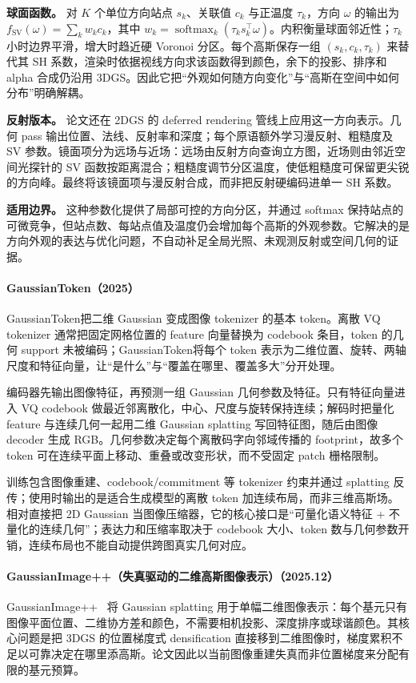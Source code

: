 \textbf{球面函数。} 对 $K$ 个单位方向站点 $s_k$、关联值 $c_k$ 与正温度 $\tau_k$，方向 $\omega$ 的输出为 $f_{\mathrm{SV}}(\omega)=\sum_k w_kc_k$，其中 $w_k=\operatorname{softmax}_k(\tau_k s_k^\top\omega)$。内积衡量球面邻近性；$\tau_k$ 小时边界平滑，增大时趋近硬 Voronoi 分区。每个高斯保存一组 $(s_k,c_k,\tau_k)$ 来替代其 SH 系数，渲染时依据视线方向求该函数得到颜色，余下的投影、排序和 alpha 合成仍沿用 3DGS。因此它把“外观如何随方向变化”与“高斯在空间中如何分布”明确解耦。

\textbf{反射版本。} 论文还在 2DGS 的 deferred rendering 管线上应用这一方向表示。几何 pass 输出位置、法线、反射率和深度；每个原语额外学习漫反射、粗糙度及 SV 参数。镜面项分为远场与近场：远场由反射方向查询立方图，近场则由邻近空间光探针的 SV 函数按距离混合；粗糙度调节分区温度，使低粗糙度可保留更尖锐的方向峰。最终将该镜面项与漫反射合成，而非把反射硬编码进单一 SH 系数。

\textbf{适用边界。} 这种参数化提供了局部可控的方向分区，并通过 softmax 保持站点的可微竞争，但站点数、每站点值及温度仍会增加每个高斯的外观参数。它解决的是方向外观的表达与优化问题，不自动补足全局光照、未观测反射或空间几何的证据。

\paragraph{GaussianToken（2025）\cite{2501_15619}}
GaussianToken把二维 Gaussian 变成图像 tokenizer 的基本 token。离散 VQ tokenizer 通常把固定网格位置的 feature 向量替换为 codebook 条目，token 的几何 support 未被编码；GaussianToken将每个 token 表示为二维位置、旋转、两轴尺度和特征向量，让“是什么”与“覆盖在哪里、覆盖多大”分开处理。

编码器先输出图像特征，再预测一组 Gaussian 几何参数及特征。只有特征向量进入 VQ codebook 做最近邻离散化，中心、尺度与旋转保持连续；解码时把量化 feature 与连续几何一起用二维 Gaussian splatting 写回特征图，随后由图像 decoder 生成 RGB。几何参数决定每个离散码字向邻域传播的 footprint，故多个 token 可在连续平面上移动、重叠或改变形状，而不受固定 patch 栅格限制。

训练包含图像重建、codebook/commitment 等 tokenizer 约束并通过 splatting 反传；使用时输出的是适合生成模型的离散 token 加连续布局，而非三维高斯场。相对直接把 2D Gaussian 当图像压缩器，它的核心接口是“可量化语义特征 + 不量化的连续几何”；表达力和压缩率取决于 codebook 大小、token 数与几何参数开销，连续布局也不能自动提供跨图真实几何对应。

\paragraph{GaussianImage++（失真驱动的二维高斯图像表示）（2025.12）}
GaussianImage++~\cite{2512_19108} 将 Gaussian splatting 用于单幅二维图像表示：每个基元只有图像平面位置、二维协方差和颜色，不需要相机投影、深度排序或球谐颜色。其核心问题是把 3DGS 的位置梯度式 densification 直接移到二维图像时，梯度累积不足以可靠决定在哪里添高斯。论文因此以当前图像重建失真而非位置梯度来分配有限的基元预算。

